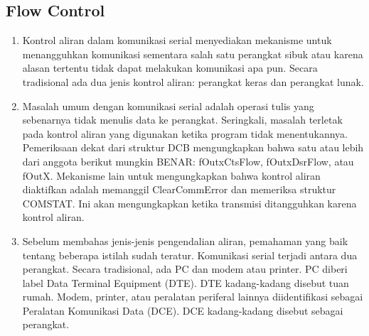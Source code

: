 \subsection{Flow Control}
	\begin{enumerate}
		\item Kontrol aliran dalam komunikasi serial menyediakan mekanisme untuk menangguhkan komunikasi sementara salah satu perangkat sibuk atau karena alasan tertentu tidak dapat melakukan komunikasi apa pun. Secara tradisional ada dua jenis kontrol aliran: perangkat keras dan perangkat lunak.

\item Masalah umum dengan komunikasi serial adalah operasi tulis yang sebenarnya tidak menulis data ke perangkat. Seringkali, masalah terletak pada kontrol aliran yang digunakan ketika program tidak menentukannya. Pemeriksaan dekat dari struktur DCB mengungkapkan bahwa satu atau lebih dari anggota berikut mungkin BENAR: fOutxCtsFlow, fOutxDsrFlow, atau fOutX. Mekanisme lain untuk mengungkapkan bahwa kontrol aliran diaktifkan adalah memanggil ClearCommError dan memeriksa struktur COMSTAT. Ini akan mengungkapkan ketika transmisi ditangguhkan karena kontrol aliran.

\item Sebelum membahas jenis-jenis pengendalian aliran, pemahaman yang baik tentang beberapa istilah sudah teratur. Komunikasi serial terjadi antara dua perangkat. Secara tradisional, ada PC dan modem atau printer. PC diberi label Data Terminal Equipment (DTE). DTE kadang-kadang disebut tuan rumah. Modem, printer, atau peralatan periferal lainnya diidentifikasi sebagai Peralatan Komunikasi Data (DCE). DCE kadang-kadang disebut sebagai perangkat.
\end{enumerate}

\cite{bai2004windows}
\cite{carvey2005tracking}
\cite{boling2003programming}			
